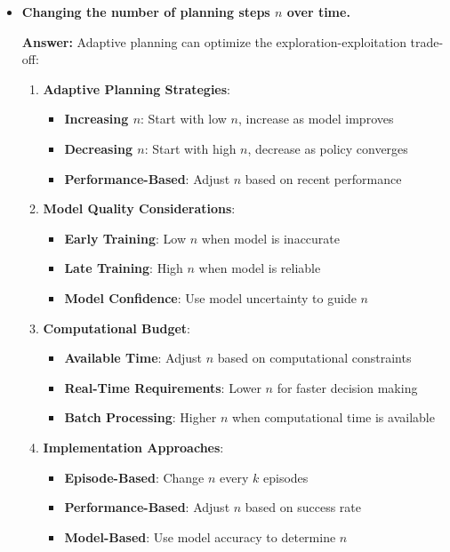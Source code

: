 \begin{itemize}
    \item \textbf{Changing the number of planning steps $n$ over time.}
    
    \textbf{Answer:} Adaptive planning can optimize the exploration-exploitation trade-off:
    
    \begin{enumerate}
        \item \textbf{Adaptive Planning Strategies}:
        \begin{itemize}
            \item \textbf{Increasing $n$}: Start with low $n$, increase as model improves
            \item \textbf{Decreasing $n$}: Start with high $n$, decrease as policy converges
            \item \textbf{Performance-Based}: Adjust $n$ based on recent performance
        \end{itemize}
        
        \item \textbf{Model Quality Considerations}:
        \begin{itemize}
            \item \textbf{Early Training}: Low $n$ when model is inaccurate
            \item \textbf{Late Training}: High $n$ when model is reliable
            \item \textbf{Model Confidence}: Use model uncertainty to guide $n$
        \end{itemize}
        
        \item \textbf{Computational Budget}:
        \begin{itemize}
            \item \textbf{Available Time}: Adjust $n$ based on computational constraints
            \item \textbf{Real-Time Requirements}: Lower $n$ for faster decision making
            \item \textbf{Batch Processing}: Higher $n$ when computational time is available
        \end{itemize}
        
        \item \textbf{Implementation Approaches}:
        \begin{itemize}
            \item \textbf{Episode-Based}: Change $n$ every $k$ episodes
            \item \textbf{Performance-Based}: Adjust $n$ based on success rate
            \item \textbf{Model-Based}: Use model accuracy to determine $n$
        \end{itemize}
    \end{enumerate}
    

\end{itemize}
